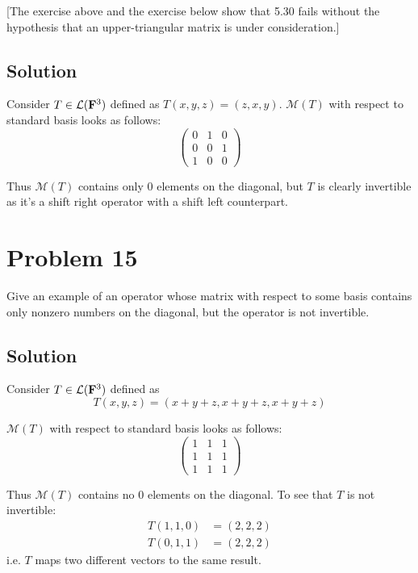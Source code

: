 \documentclass{article}
\begin{document}
\vs

[The exercise above and the exercise below show that 5.30 fails without the hypothesis that an upper-triangular matrix is under consideration.]

\subsection*{Solution}
Consider $T\in\mathcal{L}(\mathbf{F}^3)$ defined as $T(x, y, z)=(z, x, y)$. $\mathcal{M}(T)$ with respect to standard basis looks as follows:
\[
\begin{pmatrix}
    0 & 1 & 0 \\
    0 & 0 & 1 \\
    1 & 0 & 0
\end{pmatrix}
\]

Thus $\mathcal{M}(T)$ contains only $0$ elements on the diagonal, but $T$ is clearly invertible as it's a shift right operator with a shift left counterpart.

\section*{Problem 15}
Give an example of an operator whose matrix with respect to some basis contains only nonzero numbers on the diagonal, but the operator is not invertible.

\subsection*{Solution}
Consider $T\in\mathcal{L}(\mathbf{F}^3)$ defined as
\[T(x, y, z)=(x+y+z, x+y+z, x+y+z)\]

$\mathcal{M}(T)$ with respect to standard basis looks as follows:
\[
\begin{pmatrix}
    1 & 1 & 1 \\
    1 & 1 & 1 \\
    1 & 1 & 1
\end{pmatrix}
\]

Thus $\mathcal{M}(T)$ contains no $0$ elements on the diagonal. To see that $T$ is not invertible:
\begin{align*}
    T(1, 1, 0)&=(2, 2, 2)\\
    T(0, 1, 1)&=(2, 2, 2)
\end{align*}
i.e. $T$ maps two different vectors to the same result.
\end{document}

